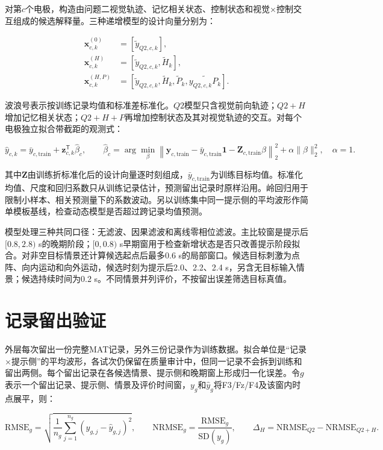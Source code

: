 \documentclass[12pt,a4paper]{article}
\begin{document}
对第\(c\)个电极，构造由问题二视觉轨迹、记忆相关状态、控制状态和视觉×控制交互组成的候选解释量。三种递增模型的设计向量分别为：

\[
\begin{aligned}
\mathbf x_{c,k}^{(0)}&=[\tilde y_{Q2,c,k}],\\
\mathbf x_{c,k}^{(H)}&=[\tilde y_{Q2,c,k},\tilde H_k],\\
\mathbf x_{c,k}^{(H,P)}&=[\tilde y_{Q2,c,k},\tilde H_k,\tilde P_k,\widetilde{y_{Q2,c,k}P_k}].
\end{aligned}
\]

波浪号表示按训练记录均值和标准差标准化。\(Q2\)模型只含视觉前向轨迹；\(Q2+H\)增加记忆相关状态；\(Q2+H+P\)再增加控制状态及其对视觉轨迹的交互。对每个电极独立拟合带截距的观测式：

\[
\hat y_{c,k}=\bar y_{c,\mathrm{train}}+\mathbf z_{c,k}^{\mathsf T}\hat\beta_c,
\qquad
\hat\beta_c=\arg\min_{\beta}\left\|\mathbf y_{c,\mathrm{train}}-\bar y_{c,\mathrm{train}}\mathbf 1-\mathbf Z_{c,\mathrm{train}}\beta\right\|_2^2+\alpha\|\beta\|_2^2,
\quad \alpha=1.
\]

其中\(\mathbf Z\)由训练折标准化后的设计向量逐时刻组成，\(\bar y_{c,\mathrm{train}}\)为训练目标均值。标准化均值、尺度和回归系数只从训练记录估计，预测留出记录时原样沿用。岭回归用于限制小样本、相关预测量下的系数波动\cite{hoerlKennard1970}。另以训练集中同一提示侧的平均波形作简单模板基线，检查动态模型是否超过跨记录均值预测。

模型处理三种共同口径：无滤波、因果滤波和离线零相位滤波。主比较窗是提示后\([0.8,2.8)\) s的晚期阶段；\([0,0.8)\) s早期窗用于检查新增状态是否只改善提示阶段拟合。对非空目标情景还计算候选起点后最多0.6 s的局部窗口。候选目标刺激为点阵、向内运动和向外运动，候选时刻为提示后2.0、2.2、2.4 s，另含无目标输入情景；候选持续时间为0.2 s。不同情景并列评价，不按留出误差筛选目标真值。

\hypertarget{ux8bb0ux5f55ux7559ux51faux9a8cux8bc1}{%
\section{记录留出验证}\label{ux8bb0ux5f55ux7559ux51faux9a8cux8bc1}}

外层每次留出一份完整MAT记录，另外三份记录作为训练数据。拟合单位是``记录×提示侧''的平均波形，各试次仍保留在质量审计中，但同一记录不会拆到训练和留出两侧。每个留出记录在各候选情景、提示侧和晚期窗上形成归一化误差。令\(g\)表示一个留出记录、提示侧、情景及评价时间窗，\(y_g\)和\(\hat y_g\)将F3/Fz/F4及该窗内时点展平，则：

\[
\mathrm{RMSE}_g=\sqrt{\frac{1}{n_g}\sum_{j=1}^{n_g}(y_{g,j}-\hat y_{g,j})^2},\qquad
\mathrm{NRMSE}_g=\frac{\mathrm{RMSE}_g}{\mathrm{SD}(y_g)},\qquad
\Delta_H=\mathrm{NRMSE}_{Q2}-\mathrm{NRMSE}_{Q2+H}.
\]
\end{document}
